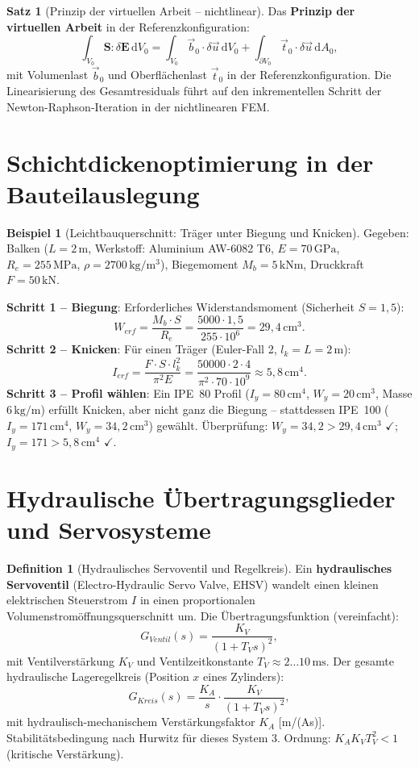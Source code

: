 ﻿\documentclass[a4paper,12pt]{report}
\theoremstyle{definition}
\newtheorem{definition}{Definition}
\newtheorem{beispiel}{Beispiel}
\newtheorem{satz}{Satz}
\begin{document}
\begin{satz}[Prinzip der virtuellen Arbeit -- nichtlinear]
Das \textbf{Prinzip der virtuellen Arbeit} in der Referenzkonfiguration:
\[
  \int_{V_0} \mathbf{S}:\delta\mathbf{E}\,\mathrm{d}V_0 = \int_{V_0}\vec{b}_0\cdot\delta\vec{u}\,\mathrm{d}V_0
  + \int_{\partial V_0}\vec{t}_0\cdot\delta\vec{u}\,\mathrm{d}A_0,
\]
mit Volumenlast $\vec{b}_0$ und Oberflächenlast $\vec{t}_0$ in der Referenzkonfiguration.
Die Linearisierung des Gesamtresiduals führt auf den inkrementellen Schritt
der Newton-Raphson-Iteration in der nichtlinearen FEM.
\end{satz}

\section{Schichtdickenoptimierung in der Bauteilauslegung}

\begin{beispiel}[Leichtbauquerschnitt: Träger unter Biegung und Knicken]
Gegeben: Balken ($L = 2\,\mathrm{m}$, Werkstoff: Aluminium AW-6082 T6,
$E = 70\,\mathrm{GPa}$, $R_e = 255\,\mathrm{MPa}$, $\rho = 2700\,\mathrm{kg/m^3}$),
Biegemoment $M_b = 5\,\mathrm{kNm}$, Druckkraft $F = 50\,\mathrm{kN}$.

\medskip\noindent\textbf{Schritt 1 -- Biegung}: Erforderliches Widerstandsmoment
(Sicherheit $S = 1{,}5$):
\[
  W_{erf} = \frac{M_b\cdot S}{R_e} = \frac{5000\cdot1{,}5}{255\cdot10^6} = 29{,}4\,\mathrm{cm^3}.
\]
\textbf{Schritt 2 -- Knicken}: Für einen Träger (Euler-Fall 2, $l_k = L = 2\,\mathrm{m}$):
\[
  I_{erf} = \frac{F\cdot S\cdot l_k^2}{\pi^2 E} = \frac{50000\cdot2\cdot4}{\pi^2\cdot70\cdot10^9}
  \approx 5{,}8\,\mathrm{cm^4}.
\]
\textbf{Schritt 3 -- Profil wählen}: Ein IPE~80 Profil
($I_y = 80\,\mathrm{cm^4}$, $W_y = 20\,\mathrm{cm^3}$, Masse $6\,\mathrm{kg/m}$)
erfüllt Knicken, aber nicht ganz die Biegung -- stattdessen IPE~100
($I_y = 171\,\mathrm{cm^4}$, $W_y = 34{,}2\,\mathrm{cm^3}$) gewählt.
Überprüfung: $W_y = 34{,}2 > 29{,}4\,\mathrm{cm^3}$ $\checkmark$; $I_y = 171 > 5{,}8\,\mathrm{cm^4}$ $\checkmark$.
\end{beispiel}

\section{Hydraulische Übertragungsglieder und Servosysteme}

\begin{definition}[Hydraulisches Servoventil und Regelkreis]
Ein \textbf{hydraulisches Servoventil} (Electro-Hydraulic Servo Valve, EHSV)
wandelt einen kleinen elektrischen Steuerstrom $I$ in einen proportionalen
Volumenstromöffnungsquerschnitt um. Die Übertragungsfunktion (vereinfacht):
\[
  G_{Ventil}(s) = \frac{K_V}{(1 + T_V s)^2},
\]
mit Ventilverstärkung $K_V$ und Ventilzeitkonstante $T_V \approx 2\ldots10\,\mathrm{ms}$.
Der gesamte hydraulische Lageregelkreis (Position $x$ eines Zylinders):
\[
  G_{Kreis}(s) = \frac{K_A}{s}\cdot\frac{K_V}{(1+T_V s)^2},
\]
mit hydraulisch-mechanischem Verstärkungsfaktor $K_A$ [m/(As)].
Stabilitätsbedingung nach Hurwitz für dieses System 3. Ordnung:
$K_A K_V T_V^2 < 1$ (kritische Verstärkung).
\end{definition}
\end{document}
